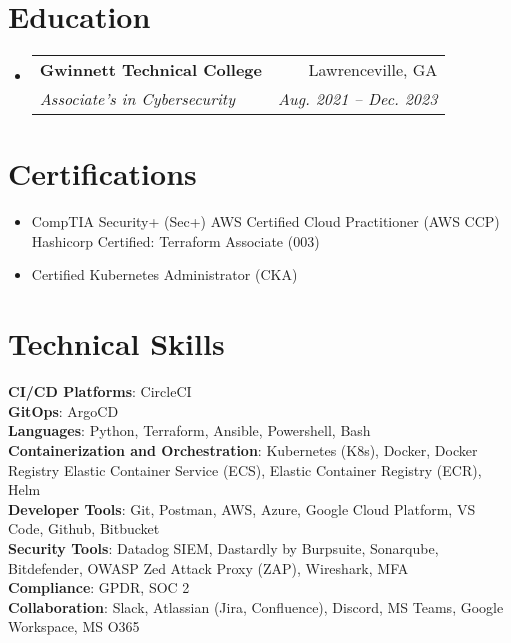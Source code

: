 \documentclass[letterpaper,10pt]{article}
\makeatletter
\newcommand{\resumeItem}[1]{
  \item\small{
    {#1 \vspace{-2pt}}
  }
}
\newcommand{\resumeSubheading}[4]{
  \vspace{-2pt}\item
    \begin{tabular*}{0.97\textwidth}[t]{l@{\extracolsep{\fill}}r}
      \textbf{#1} & #2 \\
      \textit{\small#3} & \textit{\small #4} \\
    \end{tabular*}\vspace{-7pt}
}
\newcommand{\resumeSubItem}[1]{\resumeItem{#1}\vspace{-4pt}}
\newcommand{\resumeSubHeadingListStart}{\begin{itemize}[leftmargin=0.15in, label={}]}
\newcommand{\resumeSubHeadingListEnd}{\end{itemize}}
\makeatother
\begin{document}
\section{Education}
  \resumeSubHeadingListStart
    \resumeSubheading
      {Gwinnett Technical College}{Lawrenceville, GA}
      {Associate's in Cybersecurity}{Aug. 2021 -- Dec. 2023}
  \resumeSubHeadingListEnd

\section{Certifications}
    \resumeSubHeadingListStart
    \resumeSubItem{CompTIA Security+ (Sec+)}
    {AWS Certified Cloud Practitioner (AWS CCP)}
    {Hashicorp Certified: Terraform Associate (003)}
    \resumeSubItem{Certified Kubernetes Administrator (CKA)}
    \resumeSubHeadingListEnd



\section{Technical Skills}
 \begin{itemize}[leftmargin=0.15in, label={}]
    \small{\item{
     \textbf{CI/CD Platforms}{: CircleCI} \\
     \textbf{GitOps}{: ArgoCD} \\
     \textbf{Languages}{: Python, Terraform, Ansible, Powershell, Bash } \\
     \textbf{Containerization and Orchestration}{: Kubernetes (K8s), Docker, Docker Registry  Elastic Container Service (ECS), Elastic Container Registry (ECR), Helm } \\
     \textbf{Developer Tools}{: Git, Postman, AWS, Azure, Google Cloud Platform, VS Code, Github, Bitbucket } \\
     \textbf{Security Tools}{: Datadog SIEM, Dastardly by Burpsuite, Sonarqube, Bitdefender, OWASP Zed Attack Proxy (ZAP), Wireshark, MFA} \\
     \textbf{Compliance}{: GPDR, SOC 2} \\
     \textbf{Collaboration}{: Slack, Atlassian (Jira, Confluence), Discord, MS Teams, Google Workspace, MS O365}

    }}
 \end{itemize}


\end{document}
